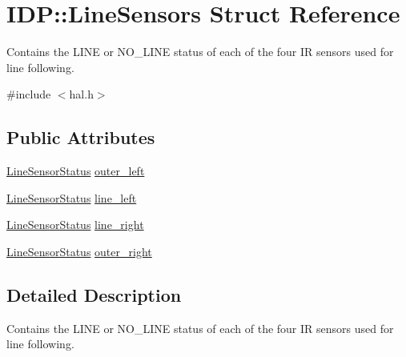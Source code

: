 \hypertarget{structIDP_1_1LineSensors}{
\section{IDP::LineSensors Struct Reference}
\label{structIDP_1_1LineSensors}
}


Contains the LINE or NO\_\-LINE status of each of the four IR sensors used for line following.  




{\ttfamily \#include $<$hal.h$>$}

\subsection*{Public Attributes}
\begin{DoxyCompactItemize}
\item 
\hyperlink{namespaceIDP_afc3b1d4cbb313bfc854f49d6f23b25f7}{LineSensorStatus} \hyperlink{structIDP_1_1LineSensors_a009bf6abf88cf3c732545da20148ba5e}{outer\_\-left}
\item 
\hyperlink{namespaceIDP_afc3b1d4cbb313bfc854f49d6f23b25f7}{LineSensorStatus} \hyperlink{structIDP_1_1LineSensors_ab986b625016c2f99536299b6d0af3f29}{line\_\-left}
\item 
\hyperlink{namespaceIDP_afc3b1d4cbb313bfc854f49d6f23b25f7}{LineSensorStatus} \hyperlink{structIDP_1_1LineSensors_a03e1692ac462e2e6744c9d5a7656c6f1}{line\_\-right}
\item 
\hyperlink{namespaceIDP_afc3b1d4cbb313bfc854f49d6f23b25f7}{LineSensorStatus} \hyperlink{structIDP_1_1LineSensors_afa87dc008f415429d15e35a49d52083c}{outer\_\-right}
\end{DoxyCompactItemize}


\subsection{Detailed Description}
Contains the LINE or NO\_\-LINE status of each of the four IR sensors used for line following. 

